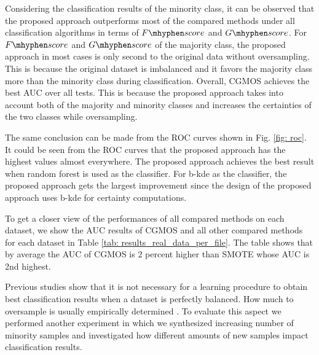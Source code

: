 \documentclass{iitthesis}
\newcommand\fscore{\mathop{F\mhyphen score}}
\newcommand\gscore{\mathop{G\mhyphen score}}
\begin{document}
Considering the classification results of the minority class, it can be observed that the proposed approach outperforms most of the compared methods under all classification algorithms in terms of $\fscore$ and $\gscore$. For $\fscore$ and $\gscore$ of the majority class, the proposed approach in most cases is only second to the original data without oversampling. This is because the original dataset is imbalanced and it favors the majority class more than the minority class during classification. Overall, CGMOS achieves the best AUC over all tests. This is because the proposed approach takes into account both of the majority and minority classes and increases the certainties of the two classes while oversampling.

The same conclusion can be made from the ROC curves shown in Fig. \ref{fig: roc}. It could be seen from the ROC curves that the proposed approach has the highest values almost everywhere. The proposed approach achieves the best result when random forest is used as the classifier. For b-kde as the classifier, the proposed approach gets the largest improvement
since the design of the proposed approach uses b-kde for certainty computations.

%

To get a closer view of the performances of all compared methods on each dataset, we show the AUC results of CGMOS and all other compared methods for each dataset in Table \ref{tab: results_real_data_per_file}. The table shows that by average the AUC of CGMOS is 2 percent higher than SMOTE whose AUC is 2nd highest. 

Previous studies show that it is not necessary for a learning procedure to obtain best classification results when a dataset is perfectly balanced\cite{batista2004study}\cite{weiss2003learning}. How much to oversample is usually empirically determined \cite{chawla2004editorial}. To evaluate this aspect we performed another experiment in which we synthesized increasing number of minority samples and investigated how different amounts of new samples impact classification results.
\end{document}
